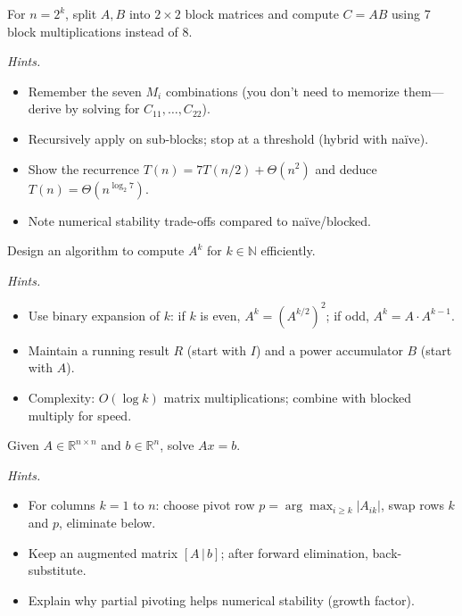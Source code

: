 \documentclass[11pt]{article}
\begin{document}
\begin{problem}
For $n=2^k$, split $A,B$ into $2\times 2$ block matrices and compute $C=AB$ using 7 block multiplications instead of 8.

\textit{Hints.}
\begin{itemize}
  \item Remember the seven $M_i$ combinations (you don’t need to memorize them—derive by solving for $C_{11},\dots,C_{22}$).
  \item Recursively apply on sub-blocks; stop at a threshold (hybrid with naïve).
  \item Show the recurrence $T(n)=7T(n/2)+\Theta(n^2)$ and deduce $T(n)=\Theta(n^{\log_2 7})$.
  \item Note numerical stability trade-offs compared to naïve/blocked.
\end{itemize}
\end{problem}

\begin{problem}
Design an algorithm to compute $A^k$ for $k\in\mathbb{N}$ efficiently.

\textit{Hints.}
\begin{itemize}
  \item Use binary expansion of $k$: if $k$ is even, $A^k=(A^{k/2})^2$; if odd, $A^k=A\cdot A^{k-1}$.
  \item Maintain a running result $R$ (start with $I$) and a power accumulator $B$ (start with $A$).
  \item Complexity: $O(\log k)$ matrix multiplications; combine with blocked multiply for speed.
\end{itemize}
\end{problem}

\begin{problem}
Given $A\in\mathbb{R}^{n\times n}$ and $b\in\mathbb{R}^n$, solve $Ax=b$.

\textit{Hints.}
\begin{itemize}
  \item For columns $k=1$ to $n$: choose pivot row $p=\arg\max_{i\ge k}|A_{ik}|$, swap rows $k$ and $p$, eliminate below.
  \item Keep an augmented matrix $[A\,|\,b]$; after forward elimination, back-substitute.
  \item Explain why partial pivoting helps numerical stability (growth factor).
\end{itemize}
\end{problem}
\end{document}
